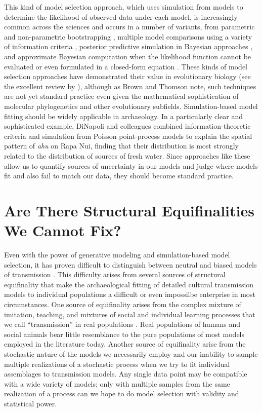This kind of model selection approach, which uses simulation from models to determine the likelihood of observed data under each model, is increasingly common across the sciences and occurs in a number of variants, from parametric and non-parametric bootstrapping \citep{efron1981nonparametric,efron1993introduction}, multiple model comparisons using a variety of information criteria \citep{burnham2002model}, posterior predictive simulation in Bayesian approaches \citep{gelman2013bayesian,gelman1996posterior,mcelreath2020statistical,robert1994bayesian}, and approximate Bayesian computation when the likelihood function cannot be evaluated or even formulated in a closed-form equation \citep{Beaumont2002,Toni2009,Beaumont2010ur,Csillery:2010jd,Marin2011,Marin2012,sisson2018handbook}.  These kinds of model selection approaches have demonstrated their value in evolutionary biology (see the excellent review by \citealp{brown2018modelperformance}), although as Brown and Thomson note, such techniques are not yet standard practice even given the mathematical sophistication of molecular phylogenetics and other evolutionary subfields.  Simulation-based model fitting should be widely applicable in archaeology.  In a particularly clear and sophisticated example, DiNapoli and colleagues \citeyearpar{dinapoli2019rapa} combined information-theoretic criteria and simulation from Poisson point-process models to explain the spatial pattern of \emph{ahu} on Rapa Nui, finding that their distribution is most strongly related to the distribution of sources of fresh water.  Since approaches like these allow us to quantify sources of uncertainty in our models and judge where models fit and also fail to match our data, they should become standard practice.  


\section{Are There Structural Equifinalities We Cannot Fix?}

Even with the power of generative modeling and simulation-based model selection, it has proven difficult to distinguish between neutral and biased models of transmission \citep{kandler2019analysing}. This difficulty arises from several sources of structural equifinality that make the archaeological fitting of detailed cultural transmission models to individual populations a difficult or even impossilbe enterprise in most circumstances.  One source of equifinality arises from the complex mixture of imitation, teaching, and mixtures of social and individual learning processes that we call ``transmission'' in real populations \citep{wimsatt2019articulating}.  Real populations of humans and social animals bear little resemblance to the pure populations of most models employed in the literature today.  Another source of equifinality arise from the stochastic nature of the models we necessarily employ and our inability to sample multiple realizations of a stochastic process when we try to fit individual assemblages to transmission models.  Any single data point may be compatible with a wide variety of models; only with multiple samples from the same realization of a process can we hope to do model selection with validity and statistical power.

